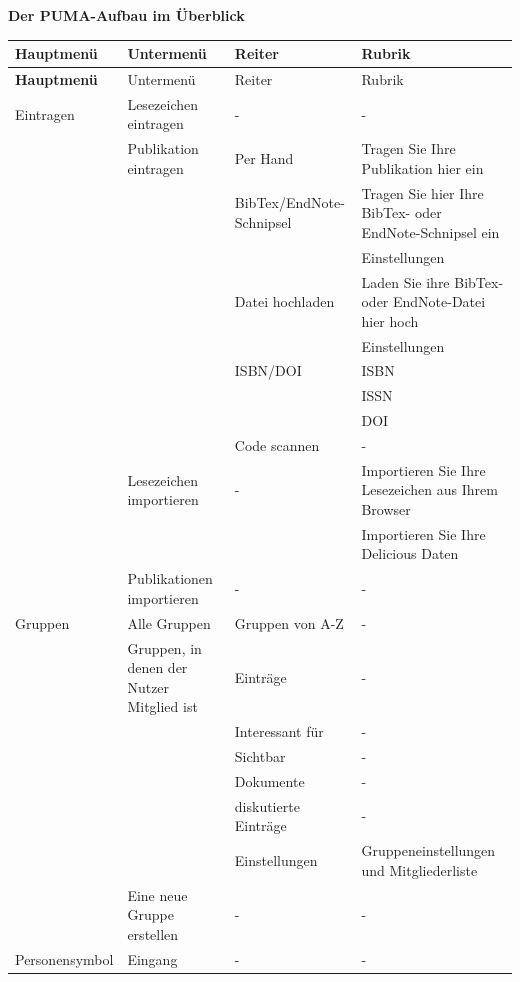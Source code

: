 \textbf{Der PUMA-Aufbau im Überblick}

\tabulinesep=1.5mm
\begin{longtabu}{|X[l]|X[l]|X[l]|X[l]|}\hline
\rowfont\bfseries
Hauptmenü & Untermenü & Reiter & Rubrik\\  \hline
\endfirsthead
\hline
\rowfont\bfseries
Hauptmenü & Untermenü & Reiter & Rubrik\\  \hline
\endhead
\hline
\endfoot
\endlastfoot
Eintragen&Lesezeichen eintragen &- &-\\ 
&Publikation eintragen &Per Hand& Tragen Sie Ihre Publikation hier ein\\
&&BibTex/EndNote-Schnipsel& Tragen Sie hier Ihre BibTex- oder EndNote-Schnipsel ein\\ 
&&& Einstellungen\\ 
&&Datei hochladen& Laden Sie ihre BibTex- oder EndNote-Datei hier hoch\\ 
&&&Einstellungen\\ 
&&ISBN/DOI& ISBN\\ 
&&& ISSN \\ 
&&&DOI\\ 
&&Code scannen&-\\ 
&Lesezeichen importieren&- &Importieren Sie Ihre Lesezeichen aus Ihrem Browser\\ 
&& & Importieren Sie Ihre Delicious Daten\\  
&Publikationen importieren &-&-\\ \hline
Gruppen&Alle Gruppen& Gruppen von A-Z &-\\ 
&Gruppen, in denen der Nutzer Mitglied ist& Einträge &-\\
&&Interessant für &- \\ 
&&Sichtbar&-\\ 
&&Dokumente&-\\ 
&&diskutierte Einträge&-\\ 
&&Einstellungen&Gruppeneinstellungen und Mitgliederliste\\ 
&Eine neue Gruppe erstellen&-&-\\ \hline
Personensymbol&Eingang&-&-\\ 

\end{longtabu}
